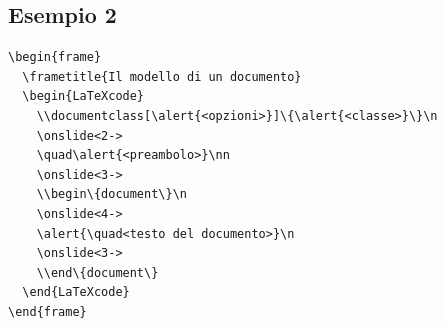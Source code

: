 \documentclass[a4paper,10pt]{article}
\begin{document}
\newpage 
\subsection*{Esempio 2}\label{ex2}

\begin{Verbatim}[gobble=0]
\begin{frame}
  \frametitle{Il modello di un documento}
  \begin{LaTeXcode}
    \\documentclass[\alert{<opzioni>}]\{\alert{<classe>}\}\n
    \onslide<2->
    \quad\alert{<preambolo>}\nn
    \onslide<3->
    \\begin\{document\}\n
    \onslide<4->
    \alert{\quad<testo del documento>}\n
    \onslide<3->
    \\end\{document\}
  \end{LaTeXcode}
\end{frame}
\end{Verbatim}

\bigskip
\begin{center}
\end{center}

\newpage 
\end{document}
